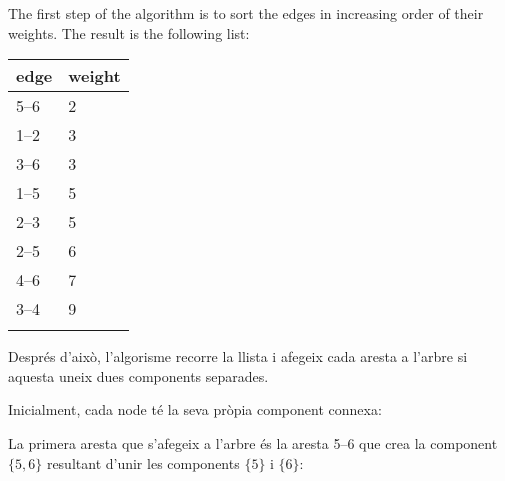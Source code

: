 \begin{samepage}
The first step of the algorithm is to sort the
edges in increasing order of their weights.
The result is the following list:

\begin{tabular}{ll}
\\
edge & weight \\
\hline
5--6 & 2 \\
1--2 & 3 \\
3--6 & 3 \\
1--5 & 5 \\
2--3 & 5 \\
2--5 & 6 \\
4--6 & 7 \\
3--4 & 9 \\
\\
\end{tabular}
\end{samepage}


Després d'això, l'algorisme recorre la llista i afegeix cada aresta a
l'arbre si aquesta uneix dues components separades.

Inicialment, cada node té la seva pròpia component connexa:


\begin{center}
\end{center}
La primera aresta que s'afegeix a l'arbre és la aresta 5--6 que crea
la component $\{5,6\}$ resultant d'unir les components $\{5\}$ i $\{6\}$:


